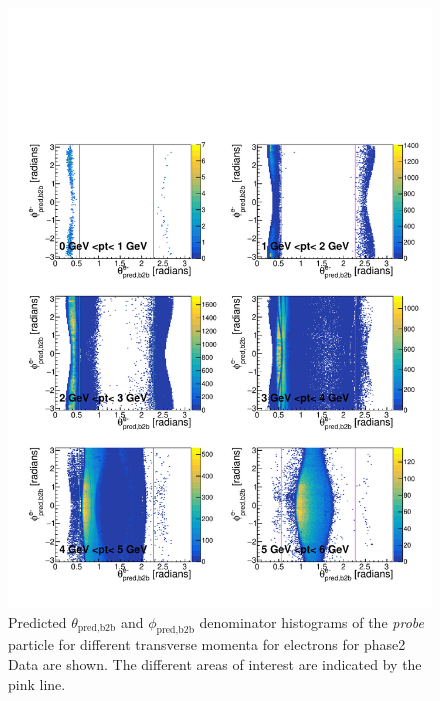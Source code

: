 \documentclass[a4paper,11pt,twosided,final,german,openbib,pdftex,listof=totoc,bibliography=totoc]{scrbook}
\begin{document}
\begin{appendix}
\begin{figure}[h!]
	\includegraphics[width=\textwidth]{Plots/master/RTPtMemD_Data.pdf}
	\caption[Denominator $\theta_{\textrm{pred,b2b}}$-$\phi_{\textrm{pred,b2b}}$ Electron Transverse Momentum Phase2 Data]{Predicted $\theta_{\textrm{pred,b2b}}$ and $\phi_{\textrm{pred,b2b}}$ denominator histograms of the \textit{probe} particle for different transverse momenta for electrons for phase2 Data are shown. The different areas of interest are indicated by the pink line.}
	\label{plt:RTPtMemD_Data}
\end{figure}


\end{appendix}
\end{document}
